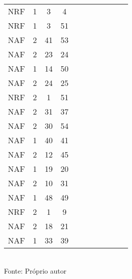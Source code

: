 \begin{table}[H]
{\begin{tabular}{ccccccccccc}
NRF & 1 & 3 & 4 &  &  &  &  &  &  &  \\
NRF & 1 & 3 & 51 &  &  &  &  &  &  &  \\
NAF & 2 & 41 & 53 &  &  &  &  &  &  &  \\
NAF & 2 & 23 & 24 &  &  &  &  &  &  &  \\
NAF & 1 & 14 & 50 &  &  &  &  &  &  &  \\
NAF & 2 & 24 & 25 &  &  &  &  &  &  &  \\
NRF & 2 & 1 & 51 &  &  &  &  &  &  &  \\
NAF & 2 & 31 & 37 &  &  &  &  &  &  &  \\
NAF & 2 & 30 & 54 &  &  &  &  &  &  &  \\
NAF & 1 & 40 & 41 &  &  &  &  &  &  &  \\
NAF & 2 & 12 & 45 &  &  &  &  &  &  &  \\
NAF & 1 & 19 & 20 &  &  &  &  &  &  &  \\
NAF & 2 & 10 & 31 &  &  &  &  &  &  &  \\
NAF & 1 & 48 & 49 &  &  &  &  &  &  &  \\
NRF & 2 & 1 & 9 &  &  &  &  &  &  &  \\
NAF & 2 & 18 & 21 &  &  &  &  &  &  &  \\
NAF & 1 & 33 & 39 &  &  &  &  &  &  &  \\
\bottomrule
\end{tabular}}
\\Fonte: Próprio autor
\end{table}


